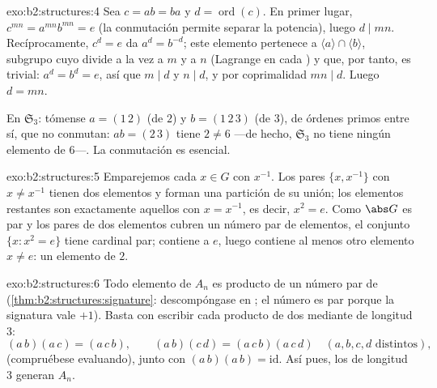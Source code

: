 \begin{solution}{exo:b2:structures:4}
Sea $c = ab = ba$ y $d = \operatorname{ord}(c)$. En primer lugar,
$c^{mn} = a^{mn} b^{mn} = e$ (la conmutación permite separar la
potencia), luego $d \mid mn$. Recíprocamente, $c^d = e$ da $a^d =
b^{-d}$; este elemento pertenece a $\langle a\rangle \cap \langle
b\rangle$, subgrupo cuyo  divide a la vez a $m$ y a $n$
(Lagrange en cada ) y que, por tanto, es trivial: $a^d
= b^d = e$, así que $m \mid d$ y $n \mid d$, y por coprimalidad $mn
\mid d$. Luego $d = mn$.

En $\mathfrak{S}_3$: tómense $a = (1\,2)$ (de  $2$) y $b =
(1\,2\,3)$ (de  $3$), de órdenes primos entre sí, que no
conmutan: $ab = (2\,3)$ tiene  $2 \neq 6$ ---de hecho,
$\mathfrak{S}_3$ no tiene ningún elemento de  $6$---. La
conmutación es esencial.
\end{solution}

\begin{solution}{exo:b2:structures:5}
Emparejemos cada $x \in G$ con $x^{-1}$. Los pares $\{x, x^{-1}\}$
con $x \neq x^{-1}$ tienen dos elementos y forman una partición de su
unión; los elementos restantes son exactamente aquellos con $x =
x^{-1}$, es decir, $x^2 = e$. Como $\abs G$ es par y los pares de dos
elementos cubren un número par de elementos, el conjunto $\{x : x^2 =
e\}$ tiene cardinal par; contiene a $e$, luego contiene al menos otro
elemento $x \neq e$: un elemento de  $2$.
\end{solution}

\begin{solution}{exo:b2:structures:6}
Todo elemento de $A_n$ es producto de un número par de
 (\cref{thm:b2:structures:signature}: descompóngase en
; el número es par porque la signatura vale $+1$).
Basta con escribir cada producto de dos  mediante
 de longitud $3$:
\[
(a\,b)(a\,c) = (a\,c\,b),
\qquad
(a\,b)(c\,d) = (a\,c\,b)(a\,c\,d) \quad (a,b,c,d \text{ distintos}),
\]
(compruébese evaluando), junto con $(a\,b)(a\,b) = \mathrm{id}$. Así
pues, los  de longitud $3$ generan $A_n$.
\end{solution}

